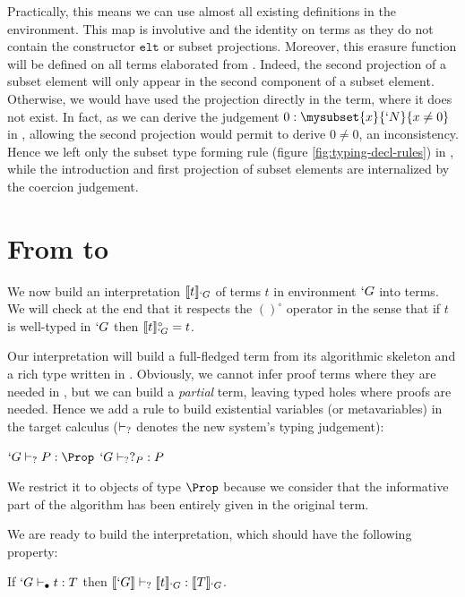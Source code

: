 \documentclass{llncs}
\def\figureshrink{0em}
\def\id#1{\texttt{#1}}
\begin{document}
Practically, this means we can use almost all existing definitions in the
\Coq environment. This map is involutive and
the identity on \Russell terms as they do not contain the constructor
$\id{elt}$ or subset projections. Moreover, this erasure function will be
defined on all \Coq terms elaborated from \Russell.
Indeed, the second projection of a
subset element will only appear in the second component of a subset
element. Otherwise, we would have used the projection directly in the
\Russell{} term, where it does not exist. In fact, as we can derive the judgement $0 : \mysubset{x}{`N}{x \neq
  0}$ in \Russell, allowing the second projection would permit to derive
$0 \neq 0$, an inconsistency.
Hence we left only the subset type forming rule (figure
\vref{fig:typing-decl-rules}) in \Russell, while the introduction and
first projection of subset elements are internalized by the coercion judgement.

\section{From \lng{} to \CICq{}}
\label{sec:Translation}
We now build an interpretation
$\llbracket t \rrbracket_{`G}$ of \Russell terms $t$ in environment $`G$ into \CIC
terms. We will check at the end that it respects the $()^{\circ}$ operator
in the sense that if $t$ is well-typed in $`G$ then $\llbracket t \rrbracket_{`G}^{\circ} = t$.

Our interpretation will build a full-fledged \CIC term from its
algorithmic skeleton and a rich type written in \Russell. Obviously, we
cannot infer proof terms where they are needed in \CIC, but we can build
a \emph{partial} term, leaving typed holes where proofs are
needed. Hence we add a rule to build existential variables (or
metavariables) in the target calculus ($\vdash_{?}$ denotes the new system's typing judgement):

\begin{center}
  \vspace{\figureshrink}
  \UAX{}
  {$`G \typeq P : \Prop$}
  {$`G \vdash_{?} ?_{P} : P$}
  {}
  \DP
  \vspace{-0.2em}
\end{center}
We restrict it to objects of type $\Prop$ because we consider that the
informative part of the algorithm has been entirely given in the
original term. 

We are ready to build the interpretation, which should have the following property:
\begin{theorem}
  \label{interp-correct}
  If $`G \vdash_{\bullet} t : T$ then $\llbracket `G \rrbracket \vdash_{?} \llbracket t \rrbracket_{`G} : \llbracket T \rrbracket_{`G}$.
\end{theorem}
\end{document}
